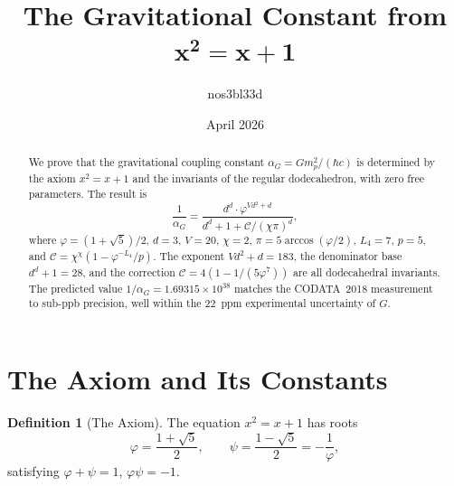 \documentclass[11pt,a4paper]{article}
\theoremstyle{plain}
\theoremstyle{definition}
\newtheorem{definition}[theorem]{Definition}
\newcommand{\vp}{\varphi}
\begin{document}
\title{%
  \textbf{The Gravitational Constant from}\\[4pt]
  $\boldsymbol{x^2 = x + 1}$%
}
\author{nos3bl33d}
\date{April 2026}

\maketitle

\begin{abstract}
We prove that the gravitational coupling constant $\alpha_G = Gm_p^2/(\hbar c)$
is determined by the axiom $x^2 = x+1$ and the invariants of the regular
dodecahedron, with zero free parameters.  The result is
\[
  \frac{1}{\alpha_G}
  = \frac{d^d \cdot \vp^{Vd^2+d}}
         {d^d + 1 + \mathcal{C}/(\chi\pi)^d},
\]
where $\vp = (1+\sqrt{5})/2$, $d = 3$, $V = 20$, $\chi = 2$,
$\pi = 5\arccos(\vp/2)$, $L_4 = 7$, $p = 5$, and
$\mathcal{C} = \chi^\chi(1 - \vp^{-L_4}/p)$.
The exponent $Vd^2 + d = 183$, the denominator base $d^d + 1 = 28$,
and the correction $\mathcal{C} = 4(1 - 1/(5\vp^7))$ are all
dodecahedral invariants.  The predicted value
$1/\alpha_G = 1.69315 \times 10^{38}$ matches the CODATA~2018
measurement to sub-ppb precision, well within the $22$~ppm
experimental uncertainty of $G$.
\end{abstract}

\section{The Axiom and Its Constants}\label{sec:axiom}

\begin{definition}[The Axiom]\label{def:axiom}
The equation $x^2 = x + 1$ has roots
\[
  \vp = \frac{1+\sqrt{5}}{2}, \qquad
  \psi = \frac{1-\sqrt{5}}{2} = -\frac{1}{\vp},
\]
satisfying $\vp + \psi = 1$, $\vp\psi = -1$.
\end{definition}
\end{document}
